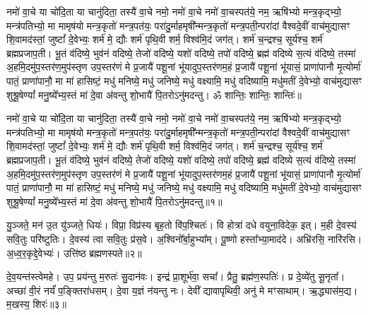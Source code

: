 \setcounter{anuvakam}{0}
नमो॑ वा॒चे या चो॑दि॒ता या चानु॑दिता॒ तस्यै॑ वा॒चे नमो॒ नमो॑ वा॒चे नमो॑ वा॒चस्पत॑ये॒ नम॒ ऋषि॑भ्यो मन्त्र॒कृद्भ्यो॒ मन्त्र॑पतिभ्यो॒ मा मामृष॑यो मन्त्र॒कृतो॑ मन्त्र॒पत॑यः॒ परा॑दु॒र्माहमृषी᳚न्मन्त्र॒कृतो॑ मन्त्र॒पती॒न्परा॑दां वैश्वदे॒वीं वाच॑मुद्यासꣳ शि॒वामद॑स्तां॒ जुष्टां᳚ दे॒वेभ्यः॒ शर्म॑ मे॒ द्यौः  शर्म॑ पृथि॒वी शर्म॒ विश्व॑मि॒दं जग॑त्। 
शर्म॑ च॒न्द्रश्च॒ सूर्य॑श्च॒ शर्म॑ ब्रह्मप्रजाप॒ती। 
भू॒तं व॑दिष्ये॒ भुव॑नं वदिष्ये॒ तेजो॑ वदिष्ये॒ यशो॑ वदिष्ये॒ तपो॑ वदिष्ये॒ ब्रह्म॑ वदिष्ये स॒त्यं व॑दिष्ये॒ तस्मा॑ अ॒हमि॒दमु॑प॒स्तर॑ण॒मुप॑स्तृण उप॒स्तर॑णं मे प्र॒जायै॑ पशू॒नां भू॑यादुप॒स्तर॑णम॒हं प्र॒जायै॑ पशू॒नां भू॑यासं॒ प्राणा॑पानौ मृ॒त्योर्मा॑ पातं॒ प्राणा॑पानौ॒ मा मा॑ हासिष्टं॒ मधु॑ मनिष्ये॒ मधु॑ जनिष्ये॒ मधु॑ वक्ष्यामि॒ मधु॑ वदिष्यामि॒ मधु॑मतीं दे॒वेभ्यो॒ वाच॑मुद्यासꣳ शुश्रू॒षेण्यां᳚ मनु॒ष्ये᳚भ्य॒स्तं मा॑ दे॒वा अ॑वन्तु शो॒भायै॑ पि॒तरोऽनु॑मदन्तु। 
ॐ शान्तिः॒ शान्तिः॒ शान्तिः॑॥ 

नमो॑ वा॒चे या चो॑दि॒ता या चानु॑दिता॒ तस्यै॑ वा॒चे नमो॒ नमो॑ वा॒चे नमो॑ वा॒चस्पत॑ये॒ नम॒ ऋषि॑भ्यो मन्त्र॒कृद्भ्यो॒ मन्त्र॑पतिभ्यो॒ मा मामृष॑यो मन्त्र॒कृतो॑ मन्त्र॒पत॑यः॒ परा॑दु॒र्माहमृषी᳚न्मन्त्र॒कृतो॑ मन्त्र॒पती॒न्परा॑दां वैश्वदे॒वीं वाच॑मुद्यासꣳ शि॒वामद॑स्तां॒ जुष्टां᳚ दे॒वेभ्यः॒ शर्म॑ मे॒ द्यौः  शर्म॑ पृथि॒वी शर्म॒ विश्व॑मि॒दं जग॑त्। 
शर्म॑ च॒न्द्रश्च॒ सूर्य॑श्च॒ शर्म॑ ब्रह्मप्रजाप॒ती। 
भू॒तं व॑दिष्ये॒ भुव॑नं वदिष्ये॒ तेजो॑ वदिष्ये॒ यशो॑ वदिष्ये॒ तपो॑ वदिष्ये॒ ब्रह्म॑ वदिष्ये स॒त्यं व॑दिष्ये॒ तस्मा॑ अ॒हमि॒दमु॑प॒स्तर॑ण॒मुप॑स्तृण उप॒स्तर॑णं मे प्र॒जायै॑ पशू॒नां भू॑यादुप॒स्तर॑णम॒हं प्र॒जायै॑ पशू॒नां भू॑यासं॒ प्राणा॑पानौ मृ॒त्योर्मा॑ पातं॒ प्राणा॑पानौ॒ मा मा॑ हासिष्टं॒ मधु॑ मनिष्ये॒ मधु॑ जनिष्ये॒ मधु॑ वक्ष्यामि॒ मधु॑ वदिष्यामि॒ मधु॑मतीं दे॒वेभ्यो॒ वाच॑मुद्यासꣳ शुश्रू॒षेण्यां᳚ मनु॒ष्ये᳚भ्य॒स्तं मा॑ दे॒वा अ॑वन्तु शो॒भायै॑ पि॒तरोऽनु॑मदन्तु॥१॥\anuvakamend

यु॒ञ्जते॒ मन॑ उ॒त यु॑ञ्जते॒ धियः॑। 
विप्रा॒ विप्र॑स्य बृह॒तो वि॑प॒श्चितः॑। 
वि होत्रा॑ दधे वयुना॒विदेक॒ इत्। 
म॒ही दे॒वस्य॑ सवि॒तुः परि॑ष्टुतिः। 
दे॒वस्य॑ त्वा सवि॒तुः प्र॑स॒वे। 
अ॒श्विनो᳚र्बा॒हुभ्या᳚म्। 
पू॒ष्णो हस्ता᳚भ्या॒माद॑दे। 
अभ्रि॑रसि॒ नारि॑रसि। 
अ॒ध्व॒र॒कृद्दे॒वेभ्यः॑। 
उत्ति॑ष्ठ ब्रह्मणस्पते॥२॥

दे॒व॒यन्त॑स्त्वेमहे। 
उप॒ प्रय॑न्तु म॒रुतः॑ सु॒दान॑वः। 
इन्द्र॑ प्रा॒शूर्भ॑वा॒ सचा᳚। 
प्रैतु॒ ब्रह्म॑ण॒स्पतिः॑। 
प्र दे॒व्ये॑तु सू॒नृता᳚। 
अच्छा॑ वी॒रं नर्यं॑ प॒ङ्क्तिरा॑धसम्। 
दे॒वा य॒ज्ञं न॑यन्तु नः। 
देवी᳚ द्यावापृथिवी॒ अनु॑ मे मꣳसाथाम्। 
ऋ॒द्ध्यास॑म॒द्य। 
म॒खस्य॒ शिरः॑॥३॥

